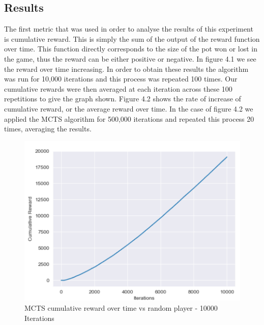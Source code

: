 \subsection{Results}\label{subsec:results1}
The first metric that was used in order to analyse the results of this experiment is cumulative reward.
This is simply the sum of the output of the reward function over time.
This function directly corresponds to the size of the pot won or lost in the game,
thus the reward can be either positive or negative.
In figure 4.1 we see the reward over time increasing.
In order to obtain these results the algorithm was run for 10,000 iterations and this process was repeated 100 times.
Our cumulative rewards were then averaged at each iteration across these 100 repetitions to give the graph shown.
Figure 4.2 shows the rate of increase of cumulative reward, or the average reward over time.
In the case of figure 4.2 we applied the MCTS algorithm for 500,000 iterations and
repeated this process 20 times, averaging the results.

\begin{figure}[ht]
    \includegraphics[scale=.8]{images/cumulative_reward_mcts_vs_random.png}
    \caption{MCTS cumulative reward over time vs random player - 10000 Iterations}
\end{figure}

